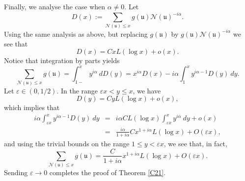 \documentclass[11pt]{amsart}
\theoremstyle{definition}
\newcommand{\NN}{{\mathcal N}}
\newcommand{\Z}{{\mathbb Z}}
\newcommand{\mf}{\mathfrak}
\begin{document}
Finally, we analyse the case when $\alpha \neq 0$. Let
\[
D(x):=\sum_{\NN(\mf u)\leq x} g(\mf u)\NN(\mf u)^{-i\alpha}.
\]
Using the same analysis as above, but replacing $g(\mf u)$ by $g(\mf u)\NN(\mf u)^{-i\alpha}$ we see that
\[D(x)=CxL(\log x)+o(x).\]
Notice that integration by parts yields
\[
\sum_{\NN(\mf u)\leq x} g(\mf u)=\int_{1-}^x y^{i\alpha} \ dD(y) = x^{i\alpha}D(x)-i\alpha\int_1^x y^{i\alpha-1}D(y) \ dy.
\]
 Let $\varepsilon \in (0,1/2)$. In the range $\varepsilon x <y\leq x$, we have
 \[
 D(y)=CyL(\log x)+o(x),
 \]
 which implies that
 \begin{eqnarray*}
      i\alpha \int_{\varepsilon x}^x y^{i\alpha-1}D(y) \ dy & = & i\alpha CL(\log x)\int_{\varepsilon x}^x y^{i\alpha} \ dy+o(x)\\ & = & \frac{i\alpha}{1+i\alpha}Cx^{1+i\alpha}L(\log x)+O(\varepsilon x),
 \end{eqnarray*}
 and using the trivial bounds on the range $1\leq y <\varepsilon x$, we see that, in fact,
 \[
 \sum_{\NN(\mf u)\leq x} g(\mf u) = \frac{C}{1+i\alpha}x^{1+i\alpha}L(\log x)+O(\varepsilon x).
 \]
 Sending $\varepsilon \to 0$ completes the proof of Theorem \ref{C21}.
 

 
\end{document}

